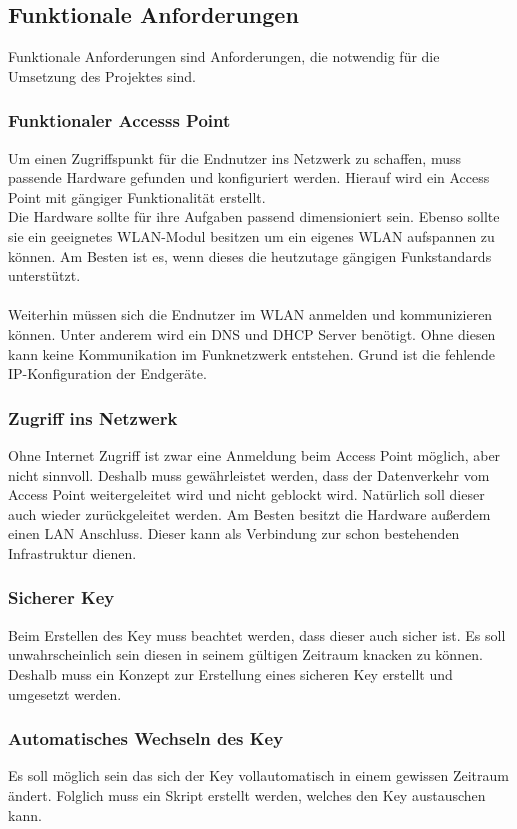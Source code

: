 \documentclass[a4paper,11pt,singlespacing]{article}
\begin{document}
			\subsection{Funktionale Anforderungen}
			Funktionale Anforderungen sind Anforderungen, die notwendig für die Umsetzung des Projektes sind.
            \subsubsection{Funktionaler Accesss Point}
                Um einen Zugriffspunkt für die Endnutzer ins Netzwerk zu schaffen, muss passende Hardware gefunden und konfiguriert werden. Hierauf wird ein Access Point mit gängiger Funktionalität erstellt.\\ 
                Die Hardware sollte für ihre Aufgaben passend dimensioniert sein. Ebenso sollte sie ein geeignetes WLAN-Modul besitzen um ein eigenes WLAN aufspannen zu können. Am Besten ist es, wenn dieses die heutzutage gängigen Funkstandards unterstützt.\\\\
                Weiterhin müssen sich die Endnutzer im WLAN anmelden und kommunizieren können. Unter anderem wird ein DNS und DHCP Server benötigt. Ohne diesen kann keine Kommunikation im Funknetzwerk entstehen. Grund ist die fehlende IP-Konfiguration der Endgeräte.
                \subsubsection{Zugriff ins Netzwerk}
                    Ohne Internet Zugriff ist zwar eine Anmeldung beim Access Point möglich, aber nicht sinnvoll.
                    Deshalb muss gewährleistet werden, dass der Datenverkehr vom Access Point weitergeleitet wird und nicht geblockt wird. Natürlich soll dieser auch wieder zurückgeleitet werden. Am Besten besitzt die Hardware außerdem einen LAN Anschluss. Dieser kann als Verbindung zur schon bestehenden Infrastruktur dienen.
                \subsubsection{Sicherer Key}
                    Beim Erstellen des Key muss beachtet werden, dass dieser auch sicher ist. Es soll unwahrscheinlich sein diesen in seinem gültigen Zeitraum knacken zu können. Deshalb muss ein Konzept zur Erstellung eines sicheren Key erstellt und umgesetzt werden. 
    			\subsubsection{Automatisches Wechseln des Key}
    			    Es soll möglich sein das sich der Key vollautomatisch in einem gewissen Zeitraum ändert. Folglich muss ein Skript erstellt werden, welches den Key austauschen kann.
\end{document}
